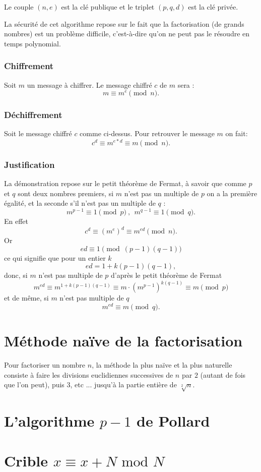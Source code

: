 \documentclass[french, 12pt, titlepage]{article}
\begin{document}
Le couple $(n, e)$ est la clé publique et le triplet $(p, q, d)$ est la clé privée.

La sécurité de cet algorithme repose sur le fait que la factorisation (de grands nombres) est un problème difficile, c'est-à-dire qu'on ne peut pas le résoudre en temps polynomial.

\subsubsection{Chiffrement}
Soit $m$ un message à chiffrer. Le message chiffré $c$ de $m$ sera :
\[ m \equiv m^e \pmod n .\]
\subsubsection{Déchiffrement}

Soit le message chiffré $c$ comme ci-dessus. Pour retrouver le message $m$ on fait:
\[ c^d \equiv m^{e*d} \equiv m \pmod n.\]

\subsubsection{Justification}

La démonstration repose sur le petit théorème de Fermat, à savoir que comme $p$ et $q$ sont deux nombres premiers, si $m$ n'est pas un multiple de $p$ on a la première égalité, et la seconde s'il n'est pas un multiple de $q$ :
\[ m^{p-1} \equiv 1 \pmod p\ ,\ \ m^{q-1} \equiv 1 \pmod q.\]
En effet
\[ c^d \equiv (m^e)^d \equiv m^{ed} \pmod n.\]
Or
\[ed \equiv 1 \pmod{(p-1)(q-1)}\]
ce qui signifie que pour un entier $k$
\[ed = 1 + k(p-1)(q-1),\]
donc, si $m$ n'est pas multiple de $p$ d'après le petit théorème de Fermat
\[m^{ed} \equiv m^{1+k(p-1)(q-1) }\equiv m\cdot \left(m^{p-1}\right)^{k(q-1)}\equiv m \pmod p\]
et de même, si $m$ n'est pas multiple de $q$
\[m^{ed}\equiv m \pmod q.\]

\section{Méthode naïve de la factorisation}

Pour factoriser un nombre $n$, la méthode la plus naïve et la plus naturelle consiste à faire les divisions euclidiennes successives de $n$ par $2$ (autant de fois que l'on peut), puis $3$, etc ... jusqu'à la partie entière de $\sqrt[2]{n}$.


\section{L'algorithme $p-1$ de Pollard}

\section{Crible $x \equiv x + N \text{ mod } N$}
\end{document}
